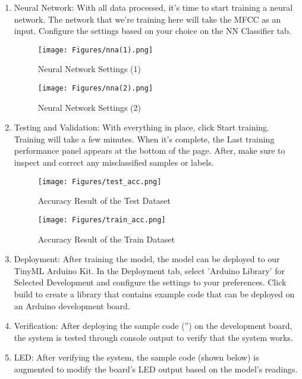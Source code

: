 \documentclass{article}
\begin{document}
\begin{enumerate}
  \item Neural Network: With all data processed, it's time to start training a neural network. The network that we're training here will take the MFCC as an input. Configure the settings based on your choice on the NN Classifier tab. 
    \begin{figure}[H]
        \centering
        \texttt{[image: Figures/nna(1).png]}
        \caption{Neural Network Settings (1)}
        \label{fig:nna1}
    \end{figure}

    \begin{figure}[H]
        \centering
        \texttt{[image: Figures/nna(2).png]}
        \caption{Neural Network Settings (2)}
        \label{fig:nna2}
    \end{figure}
  \item Testing and Validation: With everything in place, click Start training. Training will take a few minutes. When it's complete, the Last training performance panel appears at the bottom of the page. After, make sure to inspect and correct any misclassified samples or labels.

    \begin{figure}[H]
        \centering
        \texttt{[image: Figures/test\_acc.png]}
        \caption{Accuracy Result of the Test Dataset}
        \label{fig:testacc}
    \end{figure}

    \begin{figure}[H]
        \centering
        \texttt{[image: Figures/train\_acc.png]}
        \caption{Accuracy Result of the Train Dataset}
        \label{fig:trainacc}
    \end{figure}
  \item Deployment: After training the model, the model can be deployed to our TinyML Arduino Kit. In the Deployment tab, select 'Arduino Library' for Selected Development and configure the settings to your preferences. Click build to create a library that contains example code that can be deployed on an Arduino development board. 
  \item Verification: After deploying the sample code ('') on the development board, the system is tested through console output to verify that the system works. 
  \item LED: After verifying the system, the sample code (shown below) is augmented to modify the board's LED output based on the model's readings. 
  

\end{enumerate}
\end{document}
